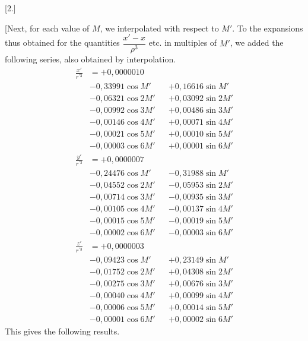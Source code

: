 \clearpage
\begingroup
{}
\renewcommand{\headrulewidth}{0pt}
\clearpage
{}
\begin{center}[2.]\end{center}
\begingroup
\small
\par\noindent\hspace*{\parindent}[Next, for each value of \(M\), we interpolated with respect to \(M'\). To the expansions thus
obtained for the quantities \(\dfrac{x'-x}{\rho^3}\) etc. in multiples of \(M'\), we added the
following series, also obtained by interpolation.
\[
\begin{aligned}
\frac{x'}{r^{\prime3}}&=+0{,}0000010&&\\
&-0{,}33991\cos M' && +0{,}16616\sin M'\\
&-0{,}06321\cos 2M' && +0{,}03092\sin 2M'\\
&-0{,}00992\cos 3M' && +0{,}00486\sin 3M'\\
&-0{,}00146\cos 4M' && +0{,}00071\sin 4M'\\
&-0{,}00021\cos 5M' && +0{,}00010\sin 5M'\\
&-0{,}00003\cos 6M' && +0{,}00001\sin 6M'
\end{aligned}
\]
\[
\begin{aligned}
\frac{y'}{r^{\prime3}}&=+0{,}0000007&&\\
&-0{,}24476\cos M' && -0{,}31988\sin M'\\
&-0{,}04552\cos 2M' && -0{,}05953\sin 2M'\\
&-0{,}00714\cos 3M' && -0{,}00935\sin 3M'\\
&-0{,}00105\cos 4M' && -0{,}00137\sin 4M'\\
&-0{,}00015\cos 5M' && -0{,}00019\sin 5M'\\
&-0{,}00002\cos 6M' && -0{,}00003\sin 6M'
\end{aligned}
\]
\[
\begin{aligned}
\frac{z'}{r^{\prime3}}&=+0{,}0000003&&\\
&-0{,}09423\cos M' && +0{,}23149\sin M'\\
&-0{,}01752\cos 2M' && +0{,}04308\sin 2M'\\
&-0{,}00275\cos 3M' && +0{,}00676\sin 3M'\\
&-0{,}00040\cos 4M' && +0{,}00099\sin 4M'\\
&-0{,}00006\cos 5M' && +0{,}00014\sin 5M'\\
&-0{,}00001\cos 6M' && +0{,}00002\sin 6M'
\end{aligned}
\]
This gives the following results.
\par
\endgroup


